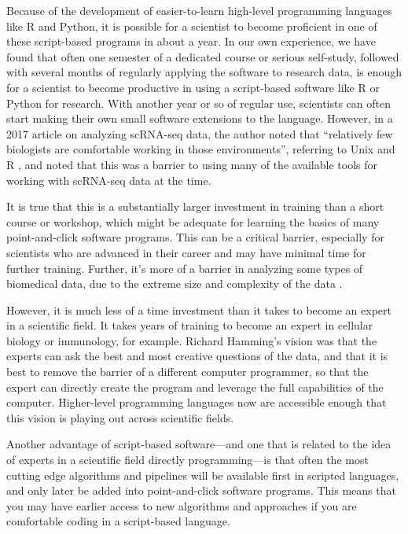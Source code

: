 \documentclass[]{tufte-book}
\begin{document}
Because of the development of easier-to-learn high-level programming languages
like R and Python, it is possible for a scientist to become proficient in one of
these script-based programs in about a year. In our own experience, we have
found that often one semester of a dedicated course or serious self-study,
followed with several months of regularly applying the software to research
data, is enough for a scientist to become productive in using a script-based
software like R or Python for research. With another year or so of regular use,
scientists can often start making their own small software extensions to the
language. However, in a 2017 article on analyzing scRNA-seq data, the author
noted that ``relatively few biologists are comfortable working in those
environments'', referring to Unix and R \citep{perkel2017single}, and noted that this
was a barrier to using many of the available tools for working with scRNA-seq
data at the time.

It is true that this is a substantially larger investment in training than a
short course or workshop, which might be adequate for learning the basics of
many point-and-click software programs. This can be a
critical barrier, especially for scientists who are advanced in their career and
may have minimal time for further training. Further, it's more of a barrier in
analyzing some types of biomedical data, due to the extreme size and complexity
of the data \citep{nekrutenko2012next}.

However, it is much less of a time investment than it takes to become an expert
in a scientific field. It takes years of training to become an expert in
cellular biology or immunology, for example. Richard Hamming's vision was that
the experts can ask the best and most creative questions of the data, and that
it is best to remove the barrier of a different computer programmer, so that the
expert can directly create the program and leverage the full capabilities of the
computer. Higher-level programming languages now are accessible enough that this
vision is playing out across scientific fields.

Another advantage of script-based software---and one that is related to the idea
of experts in a scientific field directly programming---is that often the most
cutting edge algorithms and pipelines will be available first in scripted
languages, and only later be added into point-and-click software programs. This
means that you may have earlier access to new algorithms and approaches if you
are comfortable coding in a script-based language.
\end{document}
